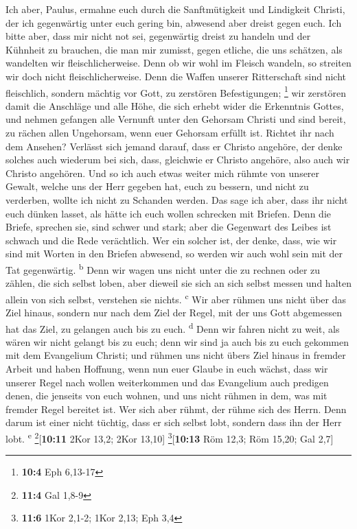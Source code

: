 Ich aber, Paulus, ermahne euch durch die Sanftmütigkeit
und Lindigkeit Christi, der ich gegenwärtig unter euch gering bin,
abwesend aber dreist gegen euch.  Ich bitte aber, dass mir
nicht not sei, gegenwärtig dreist zu handeln und der Kühnheit zu
brauchen, die man mir zumisst, gegen etliche, die uns schätzen, als
wandelten wir fleischlicherweise.  Denn ob wir wohl im
Fleisch wandeln, so streiten wir doch nicht fleischlicherweise.
 Denn die Waffen unserer Ritterschaft sind nicht
fleischlich, sondern mächtig vor Gott, zu zerstören Befestigungen;
\footnote{\textbf{10:4} Eph 6,13-17}  wir zerstören damit
die Anschläge und alle Höhe, die sich erhebt wider die Erkenntnis
Gottes, und nehmen gefangen alle Vernunft unter den Gehorsam Christi
 und sind bereit, zu rächen allen Ungehorsam, wenn euer
Gehorsam erfüllt ist.  Richtet ihr nach dem Ansehen?
Verlässt sich jemand darauf, dass er Christo angehöre, der denke solches
auch wiederum bei sich, dass, gleichwie er Christo angehöre, also auch
wir Christo angehören.  Und so ich auch etwas weiter mich
rühmte von unserer Gewalt, welche uns der Herr gegeben hat, euch zu
bessern, und nicht zu verderben, wollte ich nicht zu Schanden werden.
 Das sage ich aber, dass ihr nicht euch dünken lasset, als
hätte ich euch wollen schrecken mit Briefen.  Denn die
Briefe, sprechen sie, sind schwer und stark; aber die Gegenwart des
Leibes ist schwach und die Rede verächtlich.  Wer ein
solcher ist, der denke, dass, wie wir sind mit Worten in den Briefen
abwesend, so werden wir auch wohl sein mit der Tat gegenwärtig.
\textsuperscript{b}  Denn wir wagen uns nicht unter die
zu rechnen oder zu zählen, die sich selbst loben, aber dieweil sie sich
an sich selbst messen und halten allein von sich selbst, verstehen sie
nichts. \textsuperscript{c}  Wir aber rühmen uns nicht
über das Ziel hinaus, sondern nur nach dem Ziel der Regel, mit der uns
Gott abgemessen hat das Ziel, zu gelangen auch bis zu euch.
\textsuperscript{d}  Denn wir fahren nicht zu weit, als
wären wir nicht gelangt bis zu euch; denn wir sind ja auch bis zu euch
gekommen mit dem Evangelium Christi;  und rühmen uns
nicht übers Ziel hinaus in fremder Arbeit und haben Hoffnung, wenn nun
euer Glaube in euch wächst, dass wir unserer Regel nach wollen
weiterkommen  und das Evangelium auch predigen denen, die
jenseits von euch wohnen, und uns nicht rühmen in dem, was mit fremder
Regel bereitet ist.  Wer sich aber rühmt, der rühme sich
des Herrn.  Denn darum ist einer nicht tüchtig, dass er
sich selbst lobt, sondern dass ihn der Herr lobt. \textsuperscript{e}
\footnote{\textbf{11:4} Gal 1,8-9}{[}\textbf{10:11} 2Kor 13,2; 2Kor
13,10{]} \footnote{\textbf{11:6} 1Kor 2,1-2; 1Kor 2,13; Eph 3,4}{[}\textbf{10:13}
Röm 12,3; Röm 15,20; Gal 2,7{]}

